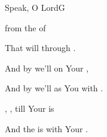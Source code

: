 \begin{song}{Speak, O Lord}{G}
\begin{SBVerse}
  
    from the  of 

That will   
    through .

And by  we'll  
    on Your ,

And by  we'll  
    as You  with .

,  , 
    till Your  is 

And the  is  
    with Your .
\end{SBVerse}
\end{song}

